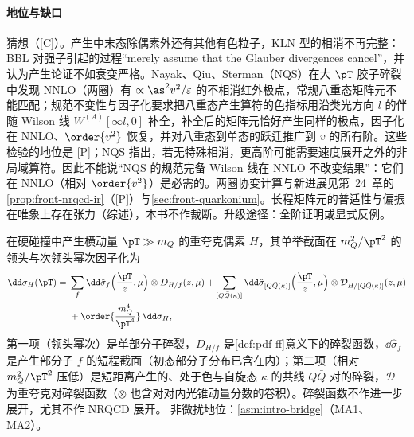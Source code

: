 \paragraph{地位与缺口}
猜想（[C]）。产生中末态除偶素外还有其他有色粒子，KLN 型的相消不再完整：BBL 对强子引起的过程“merely assume that the Glauber divergences cancel”，并认为产生论证不如衰变严格\cite[第~VI.A~节]{BodwinBraatenLepage1995}。Nayak、Qiu、Sterman（NQS）在大 $\pT$ 胶子碎裂中发现 NNLO（两圈）有 $\propto\as^2v^2/\varepsilon$ 的不相消红外极点，常规八重态矩阵元不能匹配；规范不变性与因子化要求把八重态产生算符的色指标用沿类光方向 $l$ 的伴随 Wilson 线 $W^{(A)}[\infty l,0]$ 补全，补全后的矩阵元恰好产生同样的极点，因子化在 NNLO、$\order{v^2}$ 恢复\cite{NayakQiuSterman2005a,NayakQiuSterman2005b}，并对八重态到单态的跃迁推广到 $v$ 的所有阶\cite{NayakQiuSterman2006}。这些检验的地位是 [P]；NQS 指出，若无特殊相消，更高阶可能需要速度展开之外的非局域算符\cite{NayakQiuSterman2005a}。因此不能说“NQS 的规范完备 Wilson 线在 NNLO 不改变结果”：它们在 NNLO（相对 $\order{v^2}$）是必需的。两圈协变计算与新进展见第~24~章的\cref{prop:front-nrqcd-ir}（[P]）与\cref{sec:front-quarkonium}。长程矩阵元的普适性与偏振在唯象上存在张力\cite{Butenschoen:2010rq,Butenschoen:2011yh,Butenschoen:2012px,Chao:2012iv}（综述\cite{BrambillaEtAl2011,Lansberg:2019adr}），本书不作裁断。升级途径：全阶证明或显式反例。

\begin{proposition}\label{prop:heavy-quarkonium-fragmentation}
在硬碰撞中产生横动量 $\pT\gg m_Q$ 的重夸克偶素 $H$，其单举截面在 $m_Q^2/\pT^2$ 的领头与次领头幂次因子化为
\begin{equation}\label{eq:heavy-frag}
\begin{split}
\dd\sigma_{H}(\pT)={}&\sum_f\dd\hat\sigma_{f}\Big(\frac{\pT}{z},\mu\Big)\otimes D_{H/f}(z,\mu)
+\sum_{[Q\bar Q(\kappa)]}\dd\hat\sigma_{[Q\bar Q(\kappa)]}\Big(\frac{\pT}{z},\mu\Big)\otimes\mathcal D_{H/[Q\bar Q(\kappa)]}(z,\mu)\\
&+\order{\frac{m_Q^4}{\pT^4}}\,\dd\sigma_H ,
\end{split}
\end{equation}
第一项（领头幂次）是单部分子碎裂，$D_{H/f}$ 是\cref{def:pdf-ff}意义下的碎裂函数，$\dd\hat\sigma_f$ 是产生部分子 $f$ 的短程截面（初态部分子分布已含在内）；第二项（相对 $m_Q^2/\pT^2$ 压低）是短距离产生的、处于色与自旋态 $\kappa$ 的共线 $Q\bar Q$ 对的碎裂，$\mathcal D$ 为重夸克对碎裂函数（$\otimes$ 也含对对内光锥动量分数的卷积）。碎裂函数不作进一步展开，尤其不作 NRQCD 展开。
非微扰地位：\cref{asm:intro-bridge}（MA1、MA2）。
\end{proposition}

